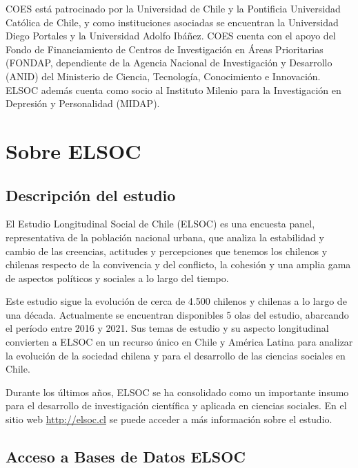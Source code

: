 \documentclass[
  12pt,
]{book}
\begin{document}
COES está patrocinado por la Universidad de Chile y la Pontificia Universidad Católica de Chile, y como instituciones asociadas se encuentran la Universidad Diego Portales y la Universidad Adolfo Ibáñez. COES cuenta con el apoyo del Fondo de Financiamiento de Centros de Investigación en Áreas Prioritarias (FONDAP, dependiente de la Agencia Nacional de Investigación y Desarrollo (ANID) del Ministerio de Ciencia, Tecnología, Conocimiento e Innovación. ELSOC además cuenta como socio al Instituto Milenio para la Investigación en Depresión y Personalidad (MIDAP).

\hypertarget{sobre-elsoc}{%
\chapter{Sobre ELSOC}\label{sobre-elsoc}}

\hypertarget{descripciuxf3n-del-estudio}{%
\section{Descripción del estudio}\label{descripciuxf3n-del-estudio}}

El Estudio Longitudinal Social de Chile (ELSOC) es una encuesta panel, representativa de la población nacional urbana, que analiza la estabilidad y cambio de las creencias, actitudes y percepciones que tenemos los chilenos y chilenas respecto de la convivencia y del conflicto, la cohesión y una amplia gama de aspectos políticos y sociales a lo largo del tiempo.

Este estudio sigue la evolución de cerca de 4.500 chilenos y chilenas a lo largo de una década. Actualmente se encuentran disponibles 5 olas del estudio, abarcando el período entre 2016 y 2021. Sus temas de estudio y su aspecto longitudinal convierten a ELSOC en un recurso único en Chile y América Latina para analizar la evolución de la sociedad chilena y para el desarrollo de las ciencias sociales en Chile.

Durante los últimos años, ELSOC se ha consolidado como un importante insumo para el desarrollo de investigación científica y aplicada en ciencias sociales. En el sitio web \url{http://elsoc.cl} se puede acceder a más información sobre el estudio.

\hypertarget{acceso-a-bases-de-datos-elsoc}{%
\section{Acceso a Bases de Datos ELSOC}\label{acceso-a-bases-de-datos-elsoc}}
\end{document}
